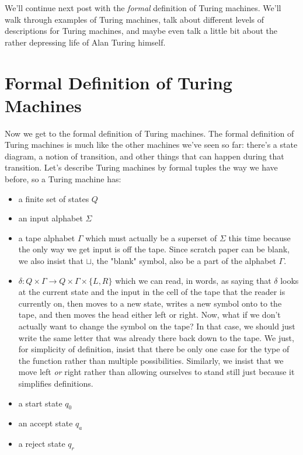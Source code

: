 \documentclass[11pt]{article}
\begin{document}
We'll continue next post with the \emph{formal} definition of Turing machines. We'll walk through examples of Turing machines, talk about different levels of descriptions for Turing machines, and maybe even talk a little bit about the rather depressing life of Alan Turing himself. 
\section{Formal Definition of Turing Machines}
\label{sec-11}
Now we get to the formal definition of Turing machines. The formal definition of Turing machines is much like the other machines we've seen so far: there's a state diagram, a notion of transition, and other things that can happen during that transition. Let's describe Turing machines by formal tuples the way we have before, so a Turing machine has:

\begin{itemize}
\item a finite set of states $Q$
\item an input alphabet $\Sigma$
\item a tape alphabet $\Gamma$ which must actually be a superset of $\Sigma$ this time because the only way we get input is off the tape. Since scratch paper can be blank, we also insist that $\sqcup$, the "blank" symbol, also be a part of the alphabet $\Gamma$.
\item $\delta : Q \times \Gamma \to Q \times \Gamma \times \{L,R\}$ which we can read, in words, as saying that $\delta$ looks at the current state and the input in the cell of the tape that the reader is currently on, then moves to a new state, writes a new symbol onto to the tape, and then moves the head either left or right. Now, what if we don't actually want to change the symbol on the tape? In that case, we should just write the same letter that was already there back down to the tape. We just, for simplicity of definition, insist that there be only one case for the type of the function rather than multiple possibilities. Similarly, we insist that we move left \emph{or} right rather than allowing ourselves to stand still just because it simplifies definitions.
\item a start state $q_0$
\item an accept state $q_a$
\item a reject state $q_r$
\end{itemize}
\end{document}
